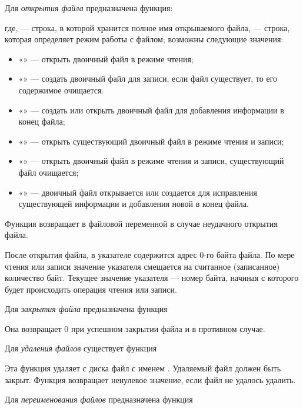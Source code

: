 Для \emph{открытия файла} предназначена функция:

где,  --- строка, в которой хранится полное имя открываемого файла,  ---
строка, которая определяет режим работы с файлом; возможны следующие значения:
\begin{itemize}
\item[] «» --- открыть двоичный файл в режиме чтения;
\item[] «» --- создать двоичный файл для записи, если файл существует, то его содержимое очищается.
\item[] «» --- создать или открыть двоичный файл для добавления информации в конец файла;
\item[] «» --- открыть существующий двоичный файл в режиме чтения и записи;
\item[] «» --- открыть двоичный файл в режиме чтения и записи, существующий файл очищается;
\item[] «» --- двоичный файл открывается или создается для исправления существующей информации и
добавления новой в конец файла.
\end{itemize}
Функция  возвращает в файловой переменной  в случае неудачного открытия файла.

После открытия файла, в указателе содержится адрес 0-го байта файла. По мере чтения или записи значение указателя
смещается на считанное (записанное) количество байт. Текущее значение указателя --- номер байта, начиная с которого будет
происходить операция чтения или записи.

Для \emph{закрытия файла} предназначена функция


Она возвращает 0 при успешном закрытии файла и  в противном случае.

Для \emph{удаления файлов} существует функция


Эта функция удаляет с диска файл с именем . Удаляемый файл должен быть закрыт. Функция
возвращает ненулевое значение, если файл не удалось удалить.

Для \emph{переименования файлов} предназначена функция


